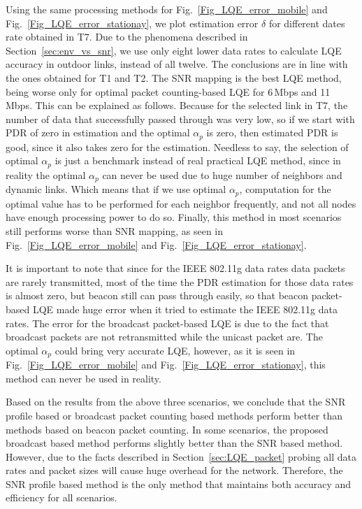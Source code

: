 \documentclass[11pt,draftclsnofoot,journal,onecolumn]{IEEEtran}
\begin{document}
Using the same processing methods for Fig.~\ref{Fig_LQE_error_mobile} and Fig.~\ref{Fig_LQE_error_stationay}, we plot estimation error $\delta$ for different dates rate obtained in T7. Due to the phenomena described in Section~\ref{sec:env_vs_snr}, we use only eight lower data rates to calculate LQE accuracy in outdoor links, instead of all twelve. The conclusions are in line with the ones obtained for T1 and T2. The SNR mapping is the best LQE method, being worse only for optimal packet counting-based LQE for 6\,Mbps and 11\,Mbps. This can be explained as follows. Because for the selected link in T7, the number of data that successfully passed through was very low, so if we start with PDR of zero in estimation and the optimal $\alpha_p$ is zero, then estimated PDR is good, since it also takes zero for the estimation. Needless to say, the selection of optimal $\alpha_p$ is just a benchmark instead of real practical LQE method, since in reality the optimal $\alpha_p$ can never be used due to huge number of neighbors and dynamic links. Which means that if we use optimal $\alpha_p$,  computation for the optimal value has to be performed for each neighbor frequently, and not all nodes have enough processing power to do so. Finally, this method in most scenarios still performs worse than SNR mapping, as seen in Fig.~\ref{Fig_LQE_error_mobile} and Fig.~\ref{Fig_LQE_error_stationay}.

It is important to note that since for the IEEE 802.11g data rates data packets are rarely transmitted, most of the time the PDR estimation for those data rates is almost zero, but beacon still can pass through easily, so that beacon packet-based LQE made huge error when it tried to estimate the IEEE 802.11g data rates. The error for the broadcast packet-based LQE is due to the fact that broadcast packets are not retransmitted while the unicast packet are. The optimal $\alpha_p$ could bring very accurate LQE, however, as it is seen in Fig.~\ref{Fig_LQE_error_mobile} and Fig.~\ref{Fig_LQE_error_stationay}, this method can never be used in reality.

Based on the results from the above three scenarios, we conclude that the SNR profile based or broadcast packet counting based methods perform better than methods based on beacon packet counting. In some scenarios, the proposed broadcast based method performs slightly better than the SNR based method. However, due to the facts described in Section~\ref{sec:LQE_packet} probing all data rates and packet sizes will cause huge overhead for the network. Therefore, the SNR profile based method is the only method that maintains both accuracy and efficiency for all scenarios.
\end{document}
